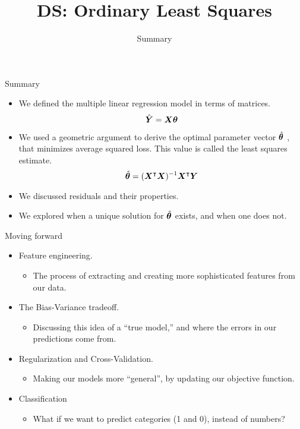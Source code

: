 \documentclass[aspectratio=169]{../latex_main/tntbeamer}  %
\title[Regression]{DS: Ordinary Least Squares}
\subtitle{Summary}
\begin{document}
	
	\maketitle
	\begin{frame}{Summary}
	    \begin{itemize}
	        \item We defined the multiple linear regression model in terms of matrices.
	        \begin{equation*}
	            \hat{\bm{Y}} = \bm{X}\bm{\theta}
	        \end{equation*}
	        \item We used a geometric argument to derive the optimal parameter vector   $\hat{\bm{\theta}}$  , that minimizes average squared loss. This value is called the least squares estimate.
	        \begin{equation*}
	            \hat{\bm{\theta}} = (\bm{X}^\intercal\bm{X})^{-1} \bm{X}^\intercal\bm{Y}
	        \end{equation*}
	        \item We discussed residuals and their properties.
	        \item We explored when a unique solution for   $\hat{\bm{\theta}}$     exists, and when one does not.
	    \end{itemize}
	\end{frame}
	
	
	\begin{frame}{Moving forward}

	    \begin{itemize}
	        \item Feature engineering.
	        \begin{itemize}
	            \item The process of extracting and creating more sophisticated features from our data.
	        \end{itemize}
	        \item The Bias-Variance tradeoff.
	        \begin{itemize}
	            \item Discussing this idea of a “true model,” and where the errors in our predictions come from.
	        \end{itemize}
	        \item Regularization and Cross-Validation.
	        \begin{itemize}
	            \item Making our models more “general”, by updating our objective function.
	        \end{itemize}
	        \item Classification
	        \begin{itemize}
	            \item What if we want to predict categories (1 and 0), instead of numbers?
	        \end{itemize}
	    \end{itemize}
	\end{frame}
	
\end{document}
